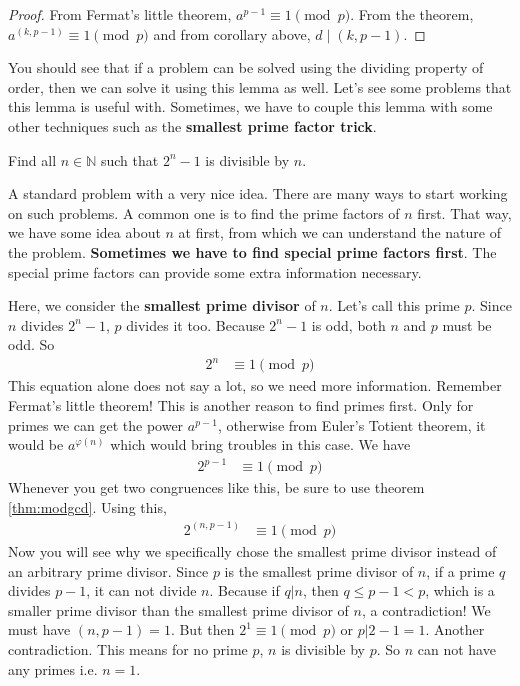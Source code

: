 	\begin{proof}
		From Fermat's little theorem, $a^{p-1}\equiv1\pmod p$. From the theorem, $a^{(k,p-1)}\equiv1\pmod p$ and from corollary above, $d\mid (k,p-1)$.
	\end{proof}
You should see that if a problem can be solved using the dividing property of order, then we can solve it using this lemma as well. Let's see some problems that this lemma is useful with. Sometimes, we have to couple this lemma with some other techniques such as the \textbf{smallest prime factor trick}.

\begin{problem}
	Find all $n\in\mathbb{N}$ such that $2^n-1$ is divisible by $n$.
\end{problem}
A standard problem with a very nice idea. There are many ways to start working on such problems. A common one is to find the prime factors of $n$ first. That way, we have some idea about $n$ at first, from which we can understand the nature of the problem. \textbf{Sometimes we have to find special prime factors first}. The special prime factors can provide some extra information necessary.
\begin{solution}
	Here, we consider the \textbf{smallest prime divisor} of $n$. Let's call this prime $p$. Since $n$ divides $2^n-1$, $p$ divides it too. Because $2^n-1$ is odd, both $n$ and $p$ must be odd. So
	\begin{align*}
		2^n & \equiv1\pmod p
	\end{align*}
	This equation alone does not say a lot, so we need more information. Remember Fermat's little theorem! This is another reason to find primes first. Only for primes we can get the power $a^{p-1}$, otherwise from Euler's Totient theorem, it would be $a^{\varphi(n)}$ which would bring troubles in this case. We have
	\begin{align*}
		2^{p-1} & \equiv1\pmod p
	\end{align*}
	Whenever you get two congruences like this, be sure to use theorem \eqref{thm:modgcd}. Using this,
	\begin{align*}
		2^{(n,p-1)} & \equiv1\pmod p
	\end{align*}
	Now you will see why we specifically chose the smallest prime divisor instead of an arbitrary prime divisor. Since $p$ is the smallest prime divisor of $n$, if a prime $q$ divides $p-1$, it can not divide $n$. Because if $q|n$, then $q\leq p-1<p$, which is a smaller prime divisor than the smallest prime divisor of $n$, a contradiction! We must have $(n,p-1)=1$. But then $2^1\equiv1\pmod p$ or $p|2-1=1$. Another contradiction. This means for no prime $p$, $n$ is divisible by $p$. So $n$ can  not have any primes i.e. $n=1$.
\end{solution}

